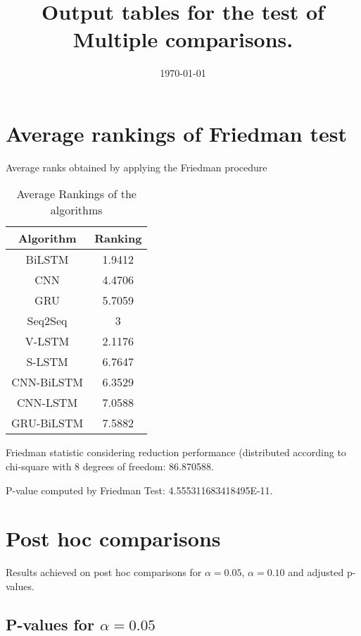 \documentclass[a4paper,10pt]{article}
\title{Output tables for the test of Multiple comparisons.}
\author{}
\date{\today}
\begin{document}
\begin{landscape}
\pagestyle{empty}
\maketitle
\thispagestyle{empty}
\section{Average rankings of Friedman test}



Average ranks obtained by applying the Friedman procedure

\begin{table}[!htp]
\centering
\begin{tabular}{|c|c|}\hline
Algorithm&Ranking\\\hline
BiLSTM & 1.9412\\
CNN & 4.4706\\
GRU & 5.7059\\
Seq2Seq & 3\\
V-LSTM & 2.1176\\
S-LSTM & 6.7647\\
CNN-BiLSTM & 6.3529\\
CNN-LSTM & 7.0588\\
GRU-BiLSTM & 7.5882\\
\hline
\end{tabular}
\caption{Average Rankings of the algorithms}
\end{table}

Friedman statistic considering reduction performance (distributed according to chi-square with 8 degrees of freedom: 86.870588.

P-value computed by Friedman Test: 4.555311683418495E-11.\newline



\pagebreak

\section{Post hoc comparisons}

Results achieved on post hoc comparisons for $\alpha = 0.05$, $\alpha = 0.10$ and adjusted p-values.

\subsection{P-values for $\alpha=0.05$}


\end{landscape}
\end{document}
